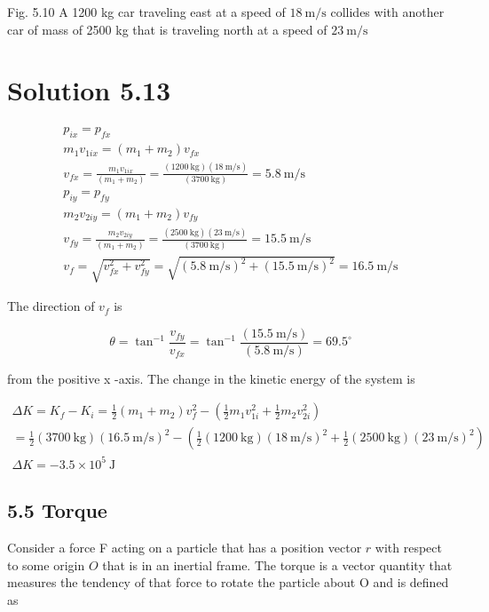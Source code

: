 \documentclass[10pt]{article}
\begin{document}
Fig. 5.10 A 1200 kg car traveling east at a speed of $18 \mathrm{~m} / \mathrm{s}$ collides with another car of mass of 2500 kg that is traveling north at a speed of $23 \mathrm{~m} / \mathrm{s}$

\section*{Solution 5.13}
$$
\begin{gathered}
p_{i x}=p_{f x} \\
m_{1} v_{1 i x}=\left(m_{1}+m_{2}\right) v_{f x} \\
v_{f x}=\frac{m_{1} v_{1 i x}}{\left(m_{1}+m_{2}\right)}=\frac{(1200 \mathrm{~kg})(18 \mathrm{~m} / \mathrm{s})}{(3700 \mathrm{~kg})}=5.8 \mathrm{~m} / \mathrm{s} \\
p_{i y}=p_{f y} \\
m_{2} v_{2 i y}=\left(m_{1}+m_{2}\right) v_{f y} \\
v_{f y}=\frac{m_{2} v_{2 i y}}{\left(m_{1}+m_{2}\right)}=\frac{(2500 \mathrm{~kg})(23 \mathrm{~m} / \mathrm{s})}{(3700 \mathrm{~kg})}=15.5 \mathrm{~m} / \mathrm{s} \\
v_{f}=\sqrt{v_{f x}^{2}+v_{f y}^{2}}=\sqrt{(5.8 \mathrm{~m} / \mathrm{s})^{2}+(15.5 \mathrm{~m} / \mathrm{s})^{2}}=16.5 \mathrm{~m} / \mathrm{s}
\end{gathered}
$$

The direction of $v_{f}$ is

$$
\theta=\tan ^{-1} \frac{v_{f y}}{v_{f x}}=\tan ^{-1} \frac{(15.5 \mathrm{~m} / \mathrm{s})}{(5.8 \mathrm{~m} / \mathrm{s})}=69.5^{\circ}
$$

from the positive x -axis. The change in the kinetic energy of the system is

$$
\begin{gathered}
\Delta K=K_{f}-K_{i}=\frac{1}{2}\left(m_{1}+m_{2}\right) v_{f}^{2}-\left(\frac{1}{2} m_{1} v_{1 i}^{2}+\frac{1}{2} m_{2} v_{2 i}^{2}\right) \\
=\frac{1}{2}(3700 \mathrm{~kg})(16.5 \mathrm{~m} / \mathrm{s})^{2}-\left(\frac{1}{2}(1200 \mathrm{~kg})(18 \mathrm{~m} / \mathrm{s})^{2}+\frac{1}{2}(2500 \mathrm{~kg})(23 \mathrm{~m} / \mathrm{s})^{2}\right) \\
\Delta K=-3.5 \times 10^{5} \mathrm{~J}
\end{gathered}
$$

\subsection*{5.5 Torque}
Consider a force F acting on a particle that has a position vector $r$ with respect to some origin $O$ that is in an inertial frame. The torque is a vector quantity that measures the tendency of that force to rotate the particle about O and is defined as
\end{document}
